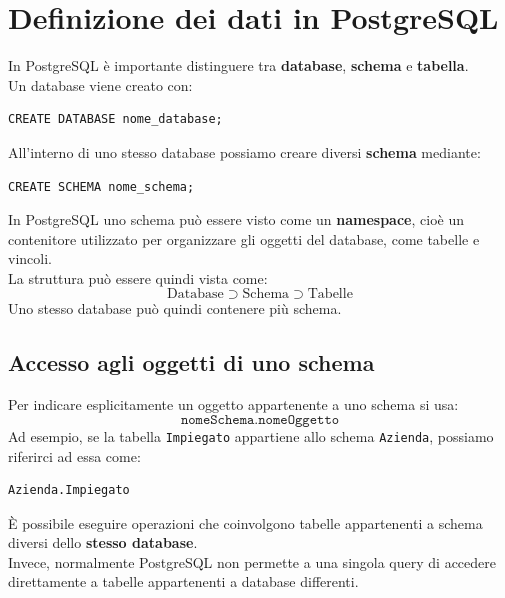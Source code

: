 \section{Definizione dei dati in PostgreSQL}
In PostgreSQL è importante distinguere tra \textbf{database},
\textbf{schema} e \textbf{tabella}.\\
Un database viene creato con:
\begin{verbatim}
CREATE DATABASE nome_database;
\end{verbatim}
\noindent All'interno di uno stesso database possiamo creare diversi
\textbf{schema} mediante:
\begin{verbatim}
CREATE SCHEMA nome_schema;
\end{verbatim}
\noindent In PostgreSQL uno schema può essere visto come un \textbf{namespace},
cioè un contenitore utilizzato per organizzare gli oggetti del database,
come tabelle e vincoli.\\
La struttura può essere quindi vista come:
\[
\boxed{
\text{Database}
\supset
\text{Schema}
\supset
\text{Tabelle}
}
\]
Uno stesso database può quindi contenere più schema.

\subsection{Accesso agli oggetti di uno schema}
Per indicare esplicitamente un oggetto appartenente a uno schema si usa:
\[
\boxed{
\texttt{nomeSchema.nomeOggetto}
}
\]
Ad esempio, se la tabella \texttt{Impiegato} appartiene allo schema
\texttt{Azienda}, possiamo riferirci ad essa come:
\begin{verbatim}
Azienda.Impiegato
\end{verbatim}
\noindent È possibile eseguire operazioni che coinvolgono tabelle appartenenti
a schema diversi dello \textbf{stesso database}.\\
Invece, normalmente PostgreSQL non permette a una singola query di
accedere direttamente a tabelle appartenenti a database differenti.


